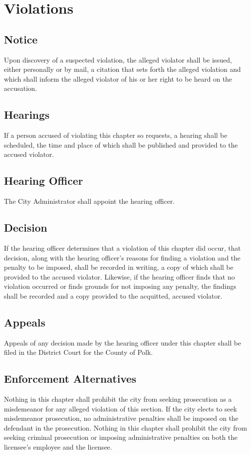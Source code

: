 \section{Violations}
\subsection{Notice}
Upon discovery of a suspected violation, the alleged violator shall be issued, either personally or by mail, a citation that sets forth the alleged violation and which shall inform the alleged violator of his or her right to be heard on the accusation.
\subsection{Hearings}
If a person accused of violating this chapter so requests, a hearing shall be scheduled, the time and place of which shall be published and provided to the accused violator.
\subsection{Hearing Officer}
The City Administrator shall appoint the hearing officer.
\subsection{Decision}
If the hearing officer determines that a violation of this chapter did occur, that decision, along with the hearing officer’s reasons for finding a violation and the penalty to be imposed, shall be recorded in writing, a copy of which shall be provided to the accused violator.  Likewise, if the hearing officer finds that no violation occurred or finds grounds for not imposing any penalty, the findings shall be recorded and a copy provided to the acquitted, accused violator.
\subsection{Appeals}
Appeals of any decision made by the hearing officer under this chapter shall be filed in the District Court for the County of Polk.
\subsection{Enforcement Alternatives}
Nothing in this chapter shall prohibit the city from seeking prosecution as a misdemeanor for any alleged violation of this section.  If the city elects to seek misdemeanor prosecution, no administrative penalties shall be imposed on the defendant in the prosecution.  Nothing in this chapter shall prohibit the city from seeking criminal prosecution or imposing administrative penalties on both the licensee’s employee and the licensee.
